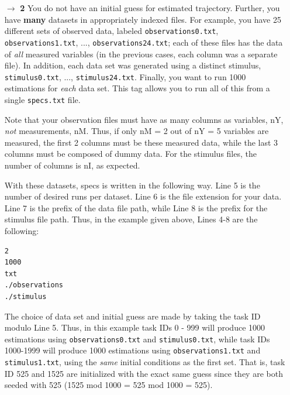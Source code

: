 \documentclass[11pt]{article}
\begin{document}
{\begin{itemize}
The initial guess file is written in Line 5 of \texttt{specs.txt}. The following nM + nI lines are for the observation and stimulus data file paths, as in the previous case. For example:

\begin{verbatim}
1
./initialization.dat
./measuredVoltage.dat
./measuredCa.dat
./injectedCurrent.dat
\end{verbatim}


\item[$\rightarrow$] {\bf 2} You do not have an initial guess for estimated trajectory. Further, you have {\bf many} datasets in appropriately indexed files. For example, you have 25 different sets of observed data, labeled \texttt{observations0.txt}, \texttt{observations1.txt}, ..., \texttt{observations24.txt}; each of these files has the data of {\it all} measured variables (in the previous cases, each column was a separate file). In addition, each data set was generated using a distinct stimulus, \texttt{stimulus0.txt}, ..., \texttt{stimulus24.txt}. Finally, you want to run 1000 estimations for {\it each} data set. This tag allows you to run all of this from a single \texttt{specs.txt} file. 

Note that your observation files must have as many columns as variables, nY, {\it not} measurements, nM. Thus, if only nM = 2 out of nY = 5 variables are measured, the first 2 columns must be these measured data, while the last 3 columns must be composed of dummy data. For the stimulus files, the number of columns is nI, as expected. 

With these datasets, specs is written in the following way. Line 5 is the number of desired runs per dataset. Line 6 is the file extension for your data. Line 7 is the prefix of the data file path, while  Line 8 is the prefix for the stimulus file path. Thus, in the example given above, Lines 4-8 are the following: 

\begin{verbatim}
2 
1000 
txt 
./observations 
./stimulus  
\end{verbatim}

The choice of data set and initial guess are made by taking the task ID modulo Line 5. Thus, in this example task IDs 0 - 999 will produce 1000 estimations using \texttt{observations0.txt} and \texttt{stimulus0.txt}, while task IDs 1000-1999 will produce 1000 estimations using \texttt{observations1.txt} and \texttt{stimulus1.txt}, using the {\it same} initial conditions as the first set. That is, task ID 525 and 1525 are initialized with the exact same guess since they are both seeded with 525 (1525 mod 1000 = 525 mod 1000 = 525). 


\end{itemize}}
\end{document}
